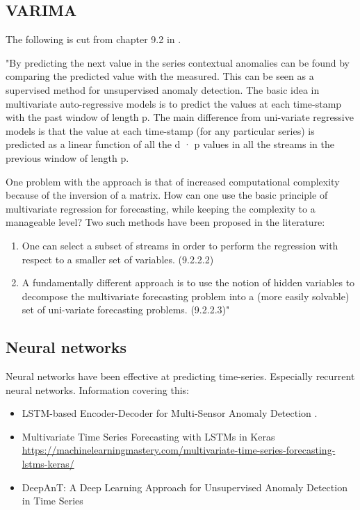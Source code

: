 \subsection{VARIMA} The following is cut from chapter 9.2 in \cite{Aggarwal2013a}. \newline

"By predicting the next value in the series contextual anomalies can be found by comparing the predicted value with the measured. This can be seen as a supervised method for unsupervised anomaly detection. The basic idea in multivariate auto-regressive models is to predict the values at each time-stamp with the past window of length p. The main difference from uni-variate regressive models is that the value at each time-stamp (for any particular series) is predicted as a linear function of all the d · p values in all the streams in the previous window of length p.

One problem with the approach is that of increased computational complexity because of the inversion of a matrix. How can one use the basic principle of multivariate regression for forecasting, while keeping the complexity to a manageable level? Two such methods have been proposed in the literature:

\begin{enumerate}
    \item One can select a subset of streams in order to perform the regression with respect to a smaller set of variables. (9.2.2.2)
    \item A fundamentally different approach is to use the notion of hidden variables to decompose the multivariate forecasting problem into a (more easily solvable) set of uni-variate forecasting problems. (9.2.2.3)"
\end{enumerate}


\subsection{Neural networks} Neural networks have been effective at predicting time-series. Especially recurrent neural networks. Information covering this: 
\begin{itemize}
    \item LSTM-based Encoder-Decoder for Multi-Sensor Anomaly Detection \cite{Malhotra2016a}.
    \item Multivariate Time Series Forecasting with LSTMs in Keras \newline \url{https://machinelearningmastery.com/multivariate-time-series-forecasting-lstms-keras/}
    \item DeepAnT: A Deep Learning Approach for Unsupervised Anomaly Detection in Time Series \cite{Munir2019DeepAnT:Series}
\end{itemize}

